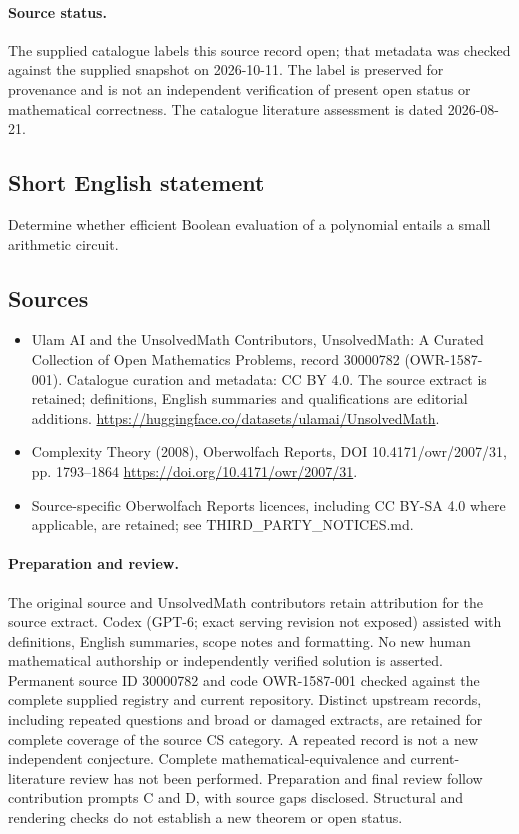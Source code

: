 \documentclass[11pt]{article}
\begin{document}
\paragraph{Source status.}
The supplied catalogue labels this source record open; that metadata was checked against the supplied snapshot on 2026-10-11. The label is preserved for provenance and is not an independent verification of present open status or mathematical correctness. The catalogue literature assessment is dated 2026-08-21.
\subsection{Short English statement}
Determine whether efficient Boolean evaluation of a polynomial entails a small arithmetic circuit.
\subsection{Sources}
\begin{itemize}
\item[\hypertarget{source:30000782:1}{S1}] Ulam AI and the UnsolvedMath Contributors, UnsolvedMath: A Curated Collection of Open Mathematics Problems, record 30000782 (OWR-1587-001). Catalogue curation and metadata: CC BY 4.0. The source extract is retained; definitions, English summaries and qualifications are editorial additions.
\url{https://huggingface.co/datasets/ulamai/UnsolvedMath}.
\item[\hypertarget{source:30000782:2}{S2}] Complexity Theory (2008), Oberwolfach Reports, DOI 10.4171/owr/2007/31, pp. 1793--1864
\url{https://doi.org/10.4171/owr/2007/31}.
\item Source-specific Oberwolfach Reports licences, including CC BY-SA 4.0 where applicable, are retained; see THIRD\_PARTY\_NOTICES.md.
\end{itemize}
\paragraph{Preparation and review.}
The original source and UnsolvedMath contributors retain attribution for the source extract. Codex (GPT-6; exact serving revision not exposed) assisted with definitions, English summaries, scope notes and formatting. No new human mathematical authorship or independently verified solution is asserted. Permanent source ID 30000782 and code OWR-1587-001 checked against the complete supplied registry and current repository. Distinct upstream records, including repeated questions and broad or damaged extracts, are retained for complete coverage of the source CS category. A repeated record is not a new independent conjecture. Complete mathematical-equivalence and current-literature review has not been performed. Preparation and final review follow contribution prompts C and D, with source gaps disclosed. Structural and rendering checks do not establish a new theorem or open status.
\label{end:30000782}
\end{document}
